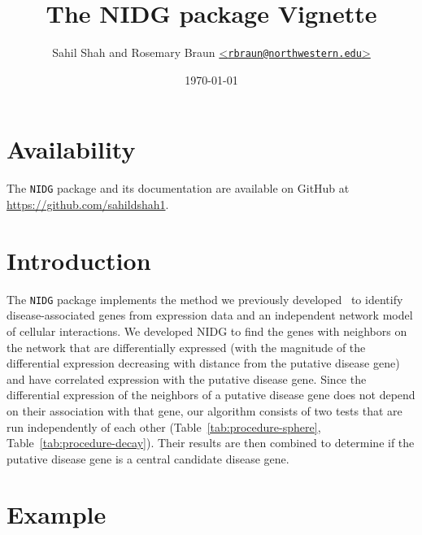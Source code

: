\documentclass[11pt]{article}
\begin{document}

\title{\vspace{-1cm}The NIDG package Vignette}

\author{Sahil Shah and Rosemary Braun 
	   \href{mailto:rbraun@northwestern.edu}{<\texttt{rbraun@northwestern.edu}>}}

\date{\today}

\maketitle


\section*{Availability}  %

The \texttt{NIDG} package and its documentation are available on GitHub at 
\url{https://github.com/sahildshah1}. 


\section*{Introduction}  %

The \texttt{NIDG} package implements the method we previously developed~\cite{SHAH2017}
to identify disease-associated genes from expression data and an independent
network model of cellular interactions. We developed NIDG to find the genes
with neighbors on the network that are differentially expressed (with the
magnitude of the differential expression decreasing with distance from the
putative disease gene) and have correlated expression with the putative disease
gene. Since the differential expression of the neighbors of a putative disease
gene does not depend on their association with that gene, our algorithm consists
of two tests that are run independently of each other 
(Table~\ref{tab:procedure-sphere}, Table~\ref{tab:procedure-decay}). Their results
are then combined to determine if the putative disease gene is a central
candidate disease gene.

\section*{Example} %
\end{document}
